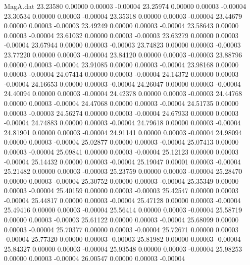 \begin{filecontents}{MagA.dat}
  23.23580    0.00000    0.00003   -0.00004
  23.25974    0.00000    0.00003   -0.00004
  23.30534    0.00000    0.00003   -0.00004
  23.35318    0.00000    0.00003   -0.00004
  23.44679    0.00000    0.00003   -0.00003
  23.49249    0.00000    0.00003   -0.00004
  23.58643    0.00000    0.00003   -0.00004
  23.61032    0.00000    0.00003   -0.00003
  23.63279    0.00000    0.00003   -0.00004
  23.67944    0.00000    0.00003   -0.00003
  23.74823    0.00000    0.00003   -0.00003
  23.77220    0.00000    0.00003   -0.00004
  23.84120    0.00000    0.00003   -0.00003
  23.88796    0.00000    0.00003   -0.00004
  23.91085    0.00000    0.00003   -0.00004
  23.98168    0.00000    0.00003   -0.00004
  24.07414    0.00000    0.00003   -0.00004
  24.14372    0.00000    0.00003   -0.00004
  24.16653    0.00000    0.00003   -0.00004
  24.26047    0.00000    0.00003   -0.00004
  24.40094    0.00000    0.00003   -0.00004
  24.42378    0.00000    0.00003   -0.00003
  24.44768    0.00000    0.00003   -0.00004
  24.47068    0.00000    0.00003   -0.00004
  24.51735    0.00000    0.00003   -0.00003
  24.56274    0.00000    0.00003   -0.00004
  24.67933    0.00000    0.00003   -0.00004
  24.74883    0.00000    0.00003   -0.00004
  24.79618    0.00000    0.00003   -0.00004
  24.81901    0.00000    0.00003   -0.00004
  24.91141    0.00000    0.00003   -0.00004
  24.98094    0.00000    0.00003   -0.00004
  25.02877    0.00000    0.00003   -0.00004
  25.07413    0.00000    0.00003   -0.00004
  25.09841    0.00000    0.00003   -0.00004
  25.12123    0.00000    0.00003   -0.00004
  25.14432    0.00000    0.00003   -0.00004
  25.19047    0.00001    0.00003   -0.00004
  25.21482    0.00000    0.00003   -0.00003
  25.23759    0.00000    0.00003   -0.00004
  25.28470    0.00000    0.00003   -0.00004
  25.30752    0.00000    0.00003   -0.00004
  25.35349    0.00000    0.00003   -0.00004
  25.40159    0.00000    0.00003   -0.00003
  25.42547    0.00000    0.00003   -0.00004
  25.44817    0.00000    0.00003   -0.00004
  25.47128    0.00000    0.00003   -0.00004
  25.49416    0.00000    0.00003   -0.00004
  25.56414    0.00000    0.00003   -0.00004
  25.58719    0.00000    0.00003   -0.00003
  25.61122    0.00000    0.00003   -0.00004
  25.68099    0.00000    0.00003   -0.00004
  25.70377    0.00000    0.00003   -0.00004
  25.72671    0.00000    0.00003   -0.00004
  25.77320    0.00000    0.00003   -0.00003
  25.81982    0.00000    0.00003   -0.00004
  25.84327    0.00000    0.00003   -0.00004
  25.93548    0.00000    0.00003   -0.00004
  25.98253    0.00000    0.00003   -0.00004
  26.00547    0.00000    0.00003   -0.00004

\end{filecontents}

